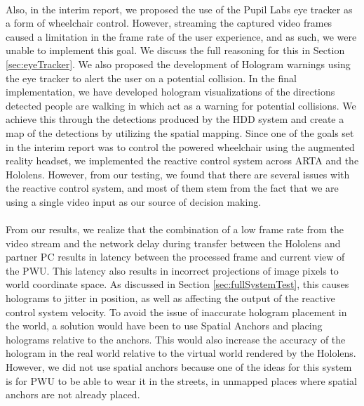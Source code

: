 \paragraph{} Also, in the interim report, we proposed the use of the Pupil Labs eye tracker as a form of wheelchair control. However, streaming the captured video frames caused a limitation in the frame rate of the user experience, and as such, we were unable to implement this goal. We discuss the full reasoning for this in Section \ref{sec:eyeTracker}. We also proposed the development of Hologram warnings using the eye tracker to alert the user on a potential collision. In the final implementation, we have developed hologram visualizations of the directions detected people are walking in which act as a warning for potential collisions. We achieve this through the detections produced by the HDD system and create a map of the detections by utilizing the spatial mapping. Since one of the goals set in the interim report was to control the powered wheelchair using the augmented reality headset, we implemented the reactive control system across ARTA and the Hololens. However, from our testing, we found that there are several issues with the reactive control system, and most of them stem from the fact that we are using a single video input as our source of decision making.

\paragraph{}From our results, we realize that the combination of a low frame rate from the video stream and the network delay during transfer between the Hololens and partner PC results in latency between the processed frame and current view of the PWU. This latency also results in incorrect projections of image pixels to world coordinate space. As discussed in Section \ref{sec:fullSystemTest}, this causes holograms to jitter in position, as well as affecting the output of the reactive control system velocity. To avoid the issue of inaccurate hologram placement in the world, a solution would have been to use Spatial Anchors and placing holograms relative to the anchors. This would also increase the accuracy of the hologram in the real world relative to the virtual world rendered by the Hololens. However, we did not use spatial anchors because one of the ideas for this system is for PWU to be able to wear it in the streets, in unmapped places where spatial anchors are not already placed. 


